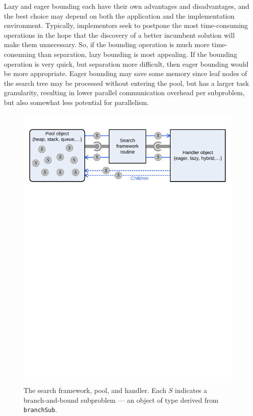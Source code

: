 Lazy and eager bounding each have their own advantages and
disadvantages, and the best choice may depend on both the application
and the implementation environment.  Typically, implementors seek to
postpone the most time-consuming operations in the hope that the
discovery of a better incumbent solution will make them unnecessary.
So, if the bounding operation is much more time-consuming than
separation, lazy bounding is most appealing.  If the bounding
operation is very quick, but separation more difficult, then eager
bounding would be more appropriate.  Eager bounding may save some
memory since leaf nodes of the search tree may be processed without
entering the pool, but has a larger task granularity, resulting in
lower parallel communication overhead per subproblem, but also
somewhat less potential for parallelism.

\begin{figure}[tbp]
\begin{center}
\includegraphics[width=\textwidth]{framework}
\vspace{-0.5in}
\end{center}
\caption{The search framework, pool, and handler.  Each $S$
indicates a branch-and-bound subproblem --- an object of type derived
from \texttt{branchSub}.}
\label{fig:poolandhandler}
\end{figure}


